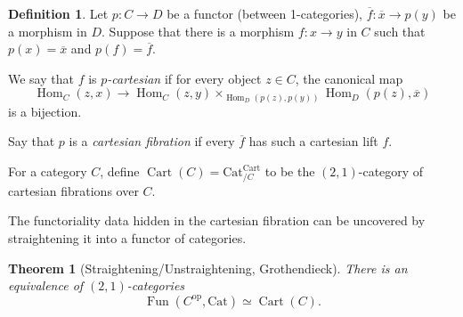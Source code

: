 \documentclass[11pt]{article}
\newtheorem{theorem}{Theorem}
\theoremstyle{definition}
\newtheorem{definition}{Definition}
\newcommand{\Cat}{\mathrm{Cat}}
\DeclareMathOperator{\Hom}{Hom}
\DeclareMathOperator{\Fun}{Fun}
\newcommand{\op}{\mathrm{op}}
\DeclareMathOperator{\Cart}{Cart}
\begin{document}
\begin{definition}
    Let $p : C \to D$ be a functor (between 1-categories), $\overline{f} : \overline{x} \to p(y)$ be a morphism in $D$. Suppose that there is a morphism $f : x \to y$ in $C$ such that $p(x) = \overline{x}$ and $p(f) = \overline{f}$.

    We say that $f$ is \emph{$p$-cartesian} if for every object $z \in C$, the canonical map
    $$\Hom_C(z, x) \to \Hom_C(z, y) \times_{\Hom_D(p(z), p(y))} \Hom_D(p(z), \overline{x})$$
    is a bijection.

    Say that $p$ is a \emph{cartesian fibration} if every $\overline{f}$ has such a cartesian lift $f$.
\end{definition}

For a category $C$, define $\Cart(C) = \Cat_{/C}^{\Cart}$ to be the $(2, 1)$-category of cartesian fibrations over $C$.

The functoriality data hidden in the cartesian fibration can be uncovered by straightening it into a functor of categories.
\begin{theorem}[Straightening/Unstraightening, Grothendieck]
    There is an equivalence of $(2, 1)$-categories
    $$\Fun(C^{\op}, \Cat) \simeq \Cart(C).$$
\end{theorem}
\end{document}
